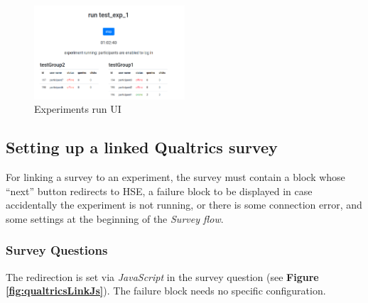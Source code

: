 \documentclass[fleqn]{article}
\begin{document}
\begin{figure} [h]
\centering
\includegraphics[width=0.5\textwidth]{img/expRunUi}
\caption{Experiments run UI}
\label{fig:expRunUi}
\end{figure}

\subsection{Setting up a linked Qualtrics survey}

For linking a survey to an experiment, the survey must contain
a block whose ``next'' button redirects to HSE, a failure block to be displayed in case accidentally the experiment is not running, or
there is some connection error,
and some settings at the beginning of the \emph{Survey flow}. 

\subsubsection{Survey Questions}

The redirection is set via \emph{JavaScript} in the survey question (see
\textbf{Figure \ref{fig:qualtricsLinkJs}}). The failure block needs no specific configuration.
\end{document}
